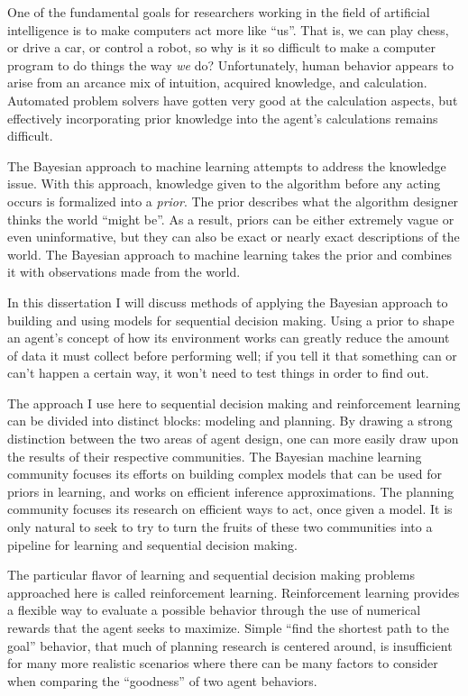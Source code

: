 One of the fundamental goals for researchers working in the field of artificial intelligence is to make computers act more like ``us''. That is, we can play chess, or drive a car, or control a robot, so why is it so difficult to make a computer program to do things the way \emph{we} do? Unfortunately, human behavior appears to arise from an arcance mix of intuition, acquired knowledge, and calculation. Automated problem solvers have gotten very good at the calculation aspects, but effectively incorporating prior knowledge into the agent's calculations remains difficult.

The Bayesian approach to machine learning attempts to address the knowledge issue. With this approach, knowledge given to the algorithm before any acting occurs is formalized into a \emph{prior}. The prior describes what the algorithm designer thinks the world ``might be''. As a result, priors can be either extremely vague or even uninformative, but they can also be exact or nearly exact descriptions of the world. The Bayesian approach to machine learning takes the prior and combines it with observations made from the world.

In this dissertation I will discuss methods of applying the Bayesian approach to building and using models for sequential decision making. Using a prior to shape an agent's concept of how its environment works can greatly reduce the amount of data it must collect before performing well; if you tell it that something can or can't happen a certain way, it won't need to test things in order to find out.


The approach I use here to sequential decision making and reinforcement learning can be divided into distinct blocks: modeling and planning. By drawing a strong distinction between the two areas of agent design, one can more easily draw upon the results of their respective communities. The Bayesian machine learning community focuses its efforts on building complex models that can be used for priors in learning, and works on efficient inference approximations. The planning community focuses its research on efficient ways to act, once given a model. It is only natural to seek to try to turn the fruits of these two communities into a pipeline for learning and sequential decision making.

The particular flavor of learning and sequential decision making problems approached here is called reinforcement learning. Reinforcement learning provides a flexible way to evaluate a possible behavior through the use of numerical rewards that the agent seeks to maximize. Simple ``find the shortest path to the goal'' behavior, that much of planning research is centered around, is insufficient for many more realistic scenarios where there can be many factors to consider when comparing the ``goodness'' of two agent behaviors.


